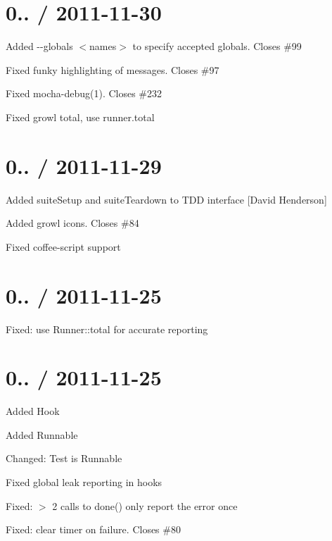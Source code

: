 \section*{0.. / 2011-\/11-\/30}


\begin{DoxyItemize}
\item Added {\ttfamily -\/-\/globals $<$names$>$} to specify accepted globals. Closes \#99
\item Fixed funky highlighting of messages. Closes \#97
\item Fixed {\ttfamily mocha-\/debug(1)}. Closes \#232
\item Fixed growl total, use runner.\+total
\end{DoxyItemize}

\section*{0.. / 2011-\/11-\/29}


\begin{DoxyItemize}
\item Added {\ttfamily suite\+Setup} and {\ttfamily suite\+Teardown} to T\+DD interface \mbox{[}David Henderson\mbox{]}
\item Added growl icons. Closes \#84
\item Fixed coffee-\/script support
\end{DoxyItemize}

\section*{0.. / 2011-\/11-\/25}


\begin{DoxyItemize}
\item Fixed\+: use {\ttfamily Runner\+::total} for accurate reporting
\end{DoxyItemize}

\section*{0.. / 2011-\/11-\/25}


\begin{DoxyItemize}
\item Added {\ttfamily Hook}
\item Added {\ttfamily Runnable}
\item Changed\+: {\ttfamily Test} is {\ttfamily Runnable}
\item Fixed global leak reporting in hooks
\item Fixed\+: $>$ 2 calls to done() only report the error once
\item Fixed\+: clear timer on failure. Closes \#80
\end{DoxyItemize}

